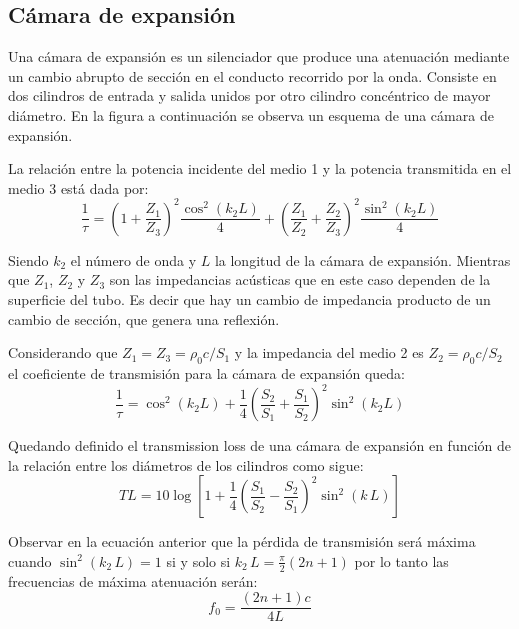 \documentclass[a5paper,12pt,twoside]{book}
\begin{document}
\subsection{Cámara de expansión}

Una cámara de expansión es un silenciador que produce una atenuación mediante un cambio abrupto de sección en el conducto recorrido por la onda.
Consiste en dos cilindros de entrada y salida unidos por otro cilindro concéntrico de mayor diámetro.
En la figura a continuación se observa un esquema de una cámara de expansión.

\begin{center}
    \def\svgwidth{\linewidth}
    
\end{center}

La relación entre la potencia incidente del medio 1 y la potencia transmitida en el medio 3 está dada por:
\begin{equation*}
    \dfrac{1}{\tau} = \left( 1+\frac{Z_1}{Z_3} \right)^2 \frac{\cos^2 (k_2 L)}{4} + \left( \frac{Z_1}{Z_2}+\frac{Z_2}{Z_3} \right)^2 \frac{\sin^2 (k_2 L)}{4}
\end{equation*}

Siendo $k_2$ el número de onda y $L$ la longitud de la cámara de expansión.
Mientras que $Z_1$, $Z_2$ y $Z_3$ son las impedancias acústicas que en este caso dependen de la superficie del tubo.
Es decir que hay un cambio de impedancia producto de un cambio de sección, que genera una reflexión.

Considerando que $Z_1=Z_3=\rho_0 c/S_1$ y la impedancia del medio 2 es $Z_2=\rho_0 c/S_2$ el coeficiente de transmisión para la cámara de expansión queda:
\begin{equation*}
    \dfrac{1}{\tau} = \cos^2 (k_2 L)+ \frac{1}{4} \left( \dfrac{S_2}{S_1} + \frac{S_1}{S_2} \right)^2 \sin^2(k_2 L)
\end{equation*}

Quedando definido el transmission loss de una cámara de expansión en función de la relación entre los diámetros de los cilindros como sigue:
\begin{equation*}
    TL = 10 \log \left[ 1 + \frac{1}{4} \left( \frac{S_1}{S_2} - \frac{S_2}{S_1} \right)^2 \sin^2 (k \, L) \right]
\end{equation*}

Observar en la ecuación anterior que la pérdida de transmisión será máxima cuando $\sin^2(k_2 \, L)=1$ si y solo si $k_2 \, L = \tfrac{\pi}{2} \left( 2n+1 \right)$ por lo tanto las frecuencias de máxima atenuación serán:
\begin{equation*}
    f_0 = \frac{\left( 2n+1 \right) c}{4L}
\end{equation*}
\end{document}
